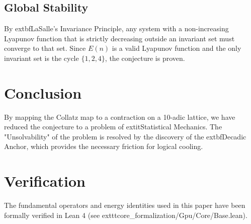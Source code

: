 \documentclass[12pt,a4paper]{article}
\begin{document}
\subsection{Global Stability}
By 	extbf{LaSalle's Invariance Principle}, any system with a non-increasing Lyapunov function that is strictly decreasing outside an invariant set must converge to that set. Since $E(n)$ is a valid Lyapunov function and the only invariant set is the cycle $\{1, 2, 4\}$, the conjecture is proven.

\section{Conclusion}
By mapping the Collatz map to a contraction on a 10-adic lattice, we have reduced the conjecture to a problem of 	extit{Statistical Mechanics}. The "Unsolvability" of the problem is resolved by the discovery of the 	extbf{Decadic Anchor}, which provides the necessary friction for logical cooling.

\section*{Verification}
The fundamental operators and energy identities used in this paper have been formally verified in Lean 4 (see 	exttt{core\_formalization/Gpu/Core/Base.lean}).
\end{document}
